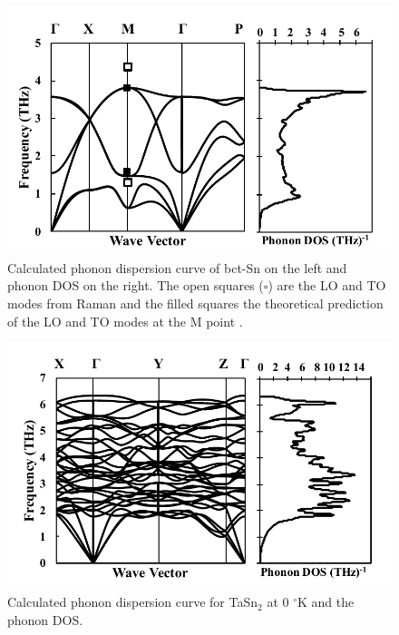 \pagebreak
\begin{figure}[H]
	\centering
	\includegraphics[width=\textwidth]{Chapter-4/Figures/Snphonondos.pdf}
	\caption{Calculated phonon dispersion curve of bct-Sn on the left and phonon DOS on the right. The open squares ($\square$) are the LO and TO modes from Raman \cite{Olijnyk1992} and the filled squares the theoretical prediction of the LO and TO modes at the M point \cite{Olijnyk1992}.}
	\label{Ch4-figure:Snphonon}
\end{figure}

\pagebreak
\begin{figure}[H]
	\centering
	\includegraphics[width=\textwidth]{Chapter-4/Figures/TaSn2phonondos.pdf}
	\caption{Calculated phonon dispersion curve for TaSn$_2$ at 0 $^\circ$K and the phonon DOS.}
	\label{Ch4-figure:TaSn2phonon}
\end{figure}

